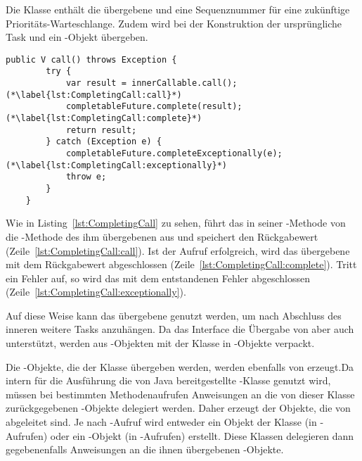 Die Klasse  enthält die übergebene  und eine Sequenznummer für eine zukünftige Prioritäts-Warteschlange. Zudem wird bei der Konstruktion der ursprüngliche Task und ein -Objekt übergeben. 
\begin{lstlisting}[caption={\code{call()}-Methode von \class{CompletingCallable}. Das enthaltene \class{Callable} wird ausgeführt und dann das \class{CompletableFuture} abgeschlossen.}, label={lst:CompletingCall},float]
	public V call() throws Exception {
		try {
			var result = innerCallable.call(); (*\label{lst:CompletingCall:call}*)
			completableFuture.complete(result); (*\label{lst:CompletingCall:complete}*)
			return result;
		} catch (Exception e) {
			completableFuture.completeExceptionally(e); (*\label{lst:CompletingCall:exceptionally}*)
			throw e;
		}
	}
\end{lstlisting}
Wie in Listing~\vref{lst:CompletingCall} zu sehen, führt das  in seiner -Methode von die -Methode des ihm übergebenen   aus und speichert den Rückgabewert (Zeile~\ref{lst:CompletingCall:call}). Ist der Aufruf erfolgreich, wird das übergebene  mit dem Rückgabewert abgeschlossen (Zeile~\ref{lst:CompletingCall:complete}). Tritt ein Fehler auf, so wird das   mit dem entstandenen Fehler abgeschlossen (Zeile~\ref{lst:CompletingCall:exceptionally}).

Auf diese Weise kann das übergebene  genutzt werden, um nach Abschluss des inneren  weitere Tasks anzuhängen.
Da das Interface  die Übergabe von  aber auch  unterstützt, werden aus -Objekten mit der Klasse  in -Objekte verpackt.

Die -Objekte, die der Klasse  übergeben werden, werden ebenfalls von  erzeugt.Da intern für die Ausführung die von Java bereitgestellte -Klasse genutzt wird, müssen bei bestimmten Methodenaufrufen Anweisungen an die von dieser Klasse zurückgegebenen -Objekte delegiert werden. Daher erzeugt der 
 Objekte, die von  abgeleitet sind. Je nach -Aufruf wird entweder ein Objekt der Klasse  (in -Aufrufen) oder ein -Objekt (in -Aufrufen) erstellt. Diese Klassen delegieren dann gegebenenfalls Anweisungen an die ihnen übergebenen -Objekte.

